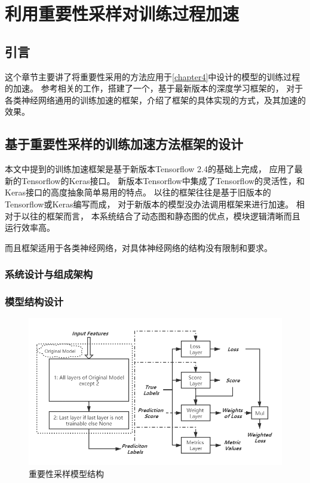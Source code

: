 
\chapter{利用重要性采样对训练过程加速}\label{chapter5}
\section{引言}
这个章节主要讲了将重要性采用的方法应用于\ref{chapter4}中设计的模型的训练过程的加速。
参考相关的工作，搭建了一个，基于最新版本的深度学习框架的，
对于各类神经网络通用的训练加速的框架，介绍了框架的具体实现的方式，及其加速的效果。

\section{基于重要性采样的训练加速方法框架的设计}
本文中提到的训练加速框架是基于新版本Tensorflow 2.4的基础上完成，
应用了最新的Tensorflow的Keras接口。
新版本Tensorflow中集成了Tensorflow的灵活性，和Keras接口的高度抽象简单易用的特点。
以往的框架往往是基于旧版本的Tensorflow或Keras编写而成，
对于新版本的模型没办法调用框架来进行加速。
相对于以往的框架而言，
本系统结合了动态图和静态图的优点，模块逻辑清晰而且运行效率高。

而且框架适用于各类神经网络，对具体神经网络的结构没有限制和要求。


\subsection{系统设计与组成架构}
\subsection{模型结构设计}

\begin{figure}
  \centering
  \includegraphics[width=1.1\linewidth]{figures/重要性采样模型结构.png}
  \caption{重要性采样模型结构}
  \label{fig:importance-sampling-model}
\end{figure}

